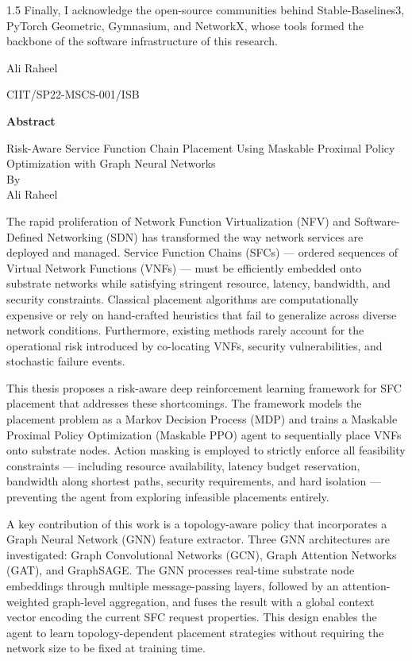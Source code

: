 \documentclass[A4paper,12pt]{report}
\theoremstyle{plain}
\theoremstyle{definition}
\theoremstyle{remark}
\numberwithin{equation}{section}
\begin{document}
\begin{spacing}{1.5}
{Finally, I acknowledge the open-source communities behind Stable-Baselines3, PyTorch Geometric, Gymnasium, and NetworkX, whose tools formed the backbone of the software infrastructure of this research.}

\vspace{0.5in}
\hspace{265pt}Ali Raheel

\hspace{240pt}CIIT/SP22-MSCS-001/ISB


\newpage
\begin{center}
\LARGE{\textbf{\textbf{Abstract}}}
\end{center}
\begin{center}
\Large{Risk-Aware Service Function Chain Placement Using Maskable Proximal Policy Optimization with Graph Neural Networks}\\
\Large{By}\\
\Large{Ali Raheel}
\end{center}

The rapid proliferation of Network Function Virtualization (NFV) and Software-Defined Networking (SDN) has transformed the way network services are deployed and managed. Service Function Chains (SFCs) — ordered sequences of Virtual Network Functions (VNFs) — must be efficiently embedded onto substrate networks while satisfying stringent resource, latency, bandwidth, and security constraints. Classical placement algorithms are computationally expensive or rely on hand-crafted heuristics that fail to generalize across diverse network conditions. Furthermore, existing methods rarely account for the operational risk introduced by co-locating VNFs, security vulnerabilities, and stochastic failure events.

This thesis proposes a risk-aware deep reinforcement learning framework for SFC placement that addresses these shortcomings. The framework models the placement problem as a Markov Decision Process (MDP) and trains a Maskable Proximal Policy Optimization (Maskable PPO) agent to sequentially place VNFs onto substrate nodes. Action masking is employed to strictly enforce all feasibility constraints — including resource availability, latency budget reservation, bandwidth along shortest paths, security requirements, and hard isolation — preventing the agent from exploring infeasible placements entirely.

A key contribution of this work is a topology-aware policy that incorporates a Graph Neural Network (GNN) feature extractor. Three GNN architectures are investigated: Graph Convolutional Networks (GCN), Graph Attention Networks (GAT), and GraphSAGE. The GNN processes real-time substrate node embeddings through multiple message-passing layers, followed by an attention-weighted graph-level aggregation, and fuses the result with a global context vector encoding the current SFC request properties. This design enables the agent to learn topology-dependent placement strategies without requiring the network size to be fixed at training time.


\end{spacing}
\end{document}
